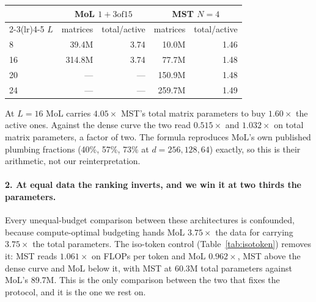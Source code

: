 \documentclass{article}
\newcommand{\dsub}{d}
\newcommand{\nsub}{N}
\begin{document}
\begin{center}
\begin{small}
\begin{tabular}{lrrrr}
\toprule
& \multicolumn{2}{c}{MoL $1{+}3\text{of}15$} & \multicolumn{2}{c}{MST $\nsub{=}4$} \\
\cmidrule(lr){2-3}\cmidrule(lr){4-5}
$L$ & matrices & total/active & matrices & total/active \\
\midrule
8  &  39.4M & 3.74 &  10.0M & 1.46 \\
16 & 314.8M & 3.74 &  77.7M & 1.48 \\
20 & ---    & ---  & 150.9M & 1.48 \\
24 & ---    & ---  & 259.7M & 1.49 \\
\bottomrule
\end{tabular}
\end{small}
\end{center}

At $L{=}16$ MoL carries $4.05\times$ MST's total matrix parameters to buy
$1.60\times$ the active ones. Against the dense curve the two read $0.515\times$
and $1.032\times$ on total matrix parameters, a factor of two. The formula
reproduces MoL's own published plumbing fractions (40\%, 57\%, 73\% at
$\dsub{=}256,128,64$) exactly, so this is their arithmetic, not our
reinterpretation.

\paragraph{2. At equal data the ranking inverts, and we win it at two thirds the
parameters.} Every unequal-budget comparison between these architectures is
confounded, because compute-optimal budgeting hands MoL $3.75\times$ the data for
carrying $3.75\times$ the total parameters. The iso-token control
(Table~\ref{tab:isotoken}) removes it: MST reads $1.061\times$ on FLOPs per token
and MoL $0.962\times$, MST above the dense curve and MoL below it, with MST at
60.3M total parameters against MoL's 89.7M. This is the only comparison between
the two that fixes the protocol, and it is the one we rest on.
\end{document}
